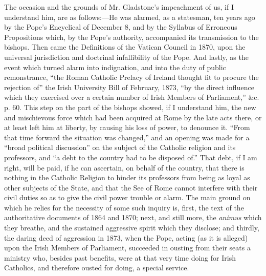 The occasion and the grounds of Mr. Gladstone's impeachment of us, if
I understand him, are as follows:—He was alarmed, as a statesman, ten
years ago by the Pope's Encyclical of December 8, and by the Syllabus of
Erroneous Propositions which, by the Pope's authority, accompanied its
transmission to the bishops. Then came the Definitions of the
Vatican Council in 1870, upon the universal jurisdiction and doctrinal
infallibility of the Pope. And lastly, as the event which turned alarm
into indignation, and into the duty of public remonstrance, ``the
Roman Catholic Prelacy of Ireland thought fit to procure the rejection
of'' the Irish University Bill of February, 1873, ``by the
direct influence which they exercised over a certain number of Irish
Members of Parliament,'' \&c. p. 60. This step on the part of the
bishops showed, if I understand him, the new and mischievous force which
had been acquired at Rome by the late acts there, or at least left him
at liberty, by causing his loss of power, to denounce it. ``From
that time forward the situation was changed,'' and an opening was
made for a ``broad political discussion'' on the subject of the
Catholic religion and its professors, and ``a debt to the country
had to be disposed of.'' That debt, if I am right, will be paid, if
he can ascertain, on behalf of the country, that there is nothing in the
Catholic Religion to hinder its professors from being as loyal as other
subjects of the State, and that the See of Rome cannot interfere with
their civil duties so as to give the civil power trouble or alarm. The
main ground on which he relies for the necessity of some such inquiry
is, first, the text of the authoritative documents of 1864 and 1870;
next, and still more, the \emph{animus} which they breathe, and the
sustained aggressive spirit which they disclose; and thirdly, the daring
deed of aggression in 1873, when the Pope, acting (as it is alleged)
upon the Irish Members of Parliament, succeeded in ousting from their
seats a ministry who, besides past benefits, were at that very time doing for Irish Catholics, and therefore ousted for doing, a
special service.

